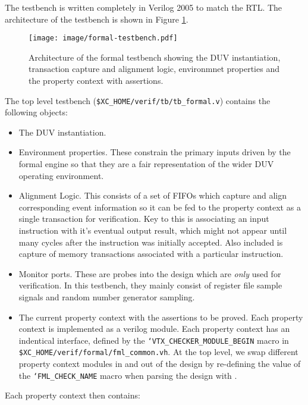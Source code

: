 The testbench is written completely in Verilog 2005 to match the RTL.
The architecture of the testbench is shown in Figure
\ref{fig:formal-tb-arch}.

\begin{figure}[h]
\centering
\texttt{[image: image/formal-testbench.pdf]}
\caption{Architecture of the formal testbench showing the DUV instantiation,
transaction capture and alignment logic, environmnet properties and
the property context with assertions.}
\label{fig:formal-tb-arch}
\end{figure}

The top level testbench ({\tt \$XC\_HOME/verif/tb/tb\_formal.v}) contains
the following objects:

\begin{itemize}
\item The DUV instantiation.
\item Environment properties.
    These constrain the primary inputs driven by the formal engine so that
    they are a fair representation of the wider DUV operating environment.
\item Alignment Logic.
    This consists of a set of FIFOs which capture and align corresponding
    event information so it can be fed to the property context as a single
    transaction for verification.
    Key to this is associating an input instruction with it's eventual
    output result, which might not appear until many cycles after the
    instruction was initially accepted.
    Also included is capture of memory transactions associated with a
    particular instruction.
\item Monitor ports.
    These are probes into the design which are {\em only} used for
    verification. In this testbench, they mainly consist of register file
    sample signals and random number generator sampling.
\item The current property context with the assertions to be proved.
    Each property context is implemented as a verilog module.
    Each property context has an indentical interface, defined by the
    {\tt `VTX\_CHECKER\_MODULE\_BEGIN}
    macro in
    {\tt \$XC\_HOME/verif/formal/fml\_common.vh}.
    At the top level, we swap different property context modules in and
    out of the design by re-defining the value of the
    {\tt `FML\_CHECK\_NAME}
    macro when parsing the design with \yosys.
\end{itemize}

\noindent
Each property context then contains:

